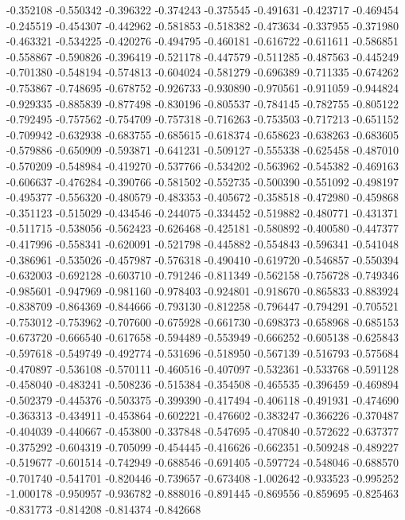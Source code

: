 -0.352108
-0.550342
-0.396322
-0.374243
-0.375545
-0.491631
-0.423717
-0.469454
-0.245519
-0.454307
-0.442962
-0.581853
-0.518382
-0.473634
-0.337955
-0.371980
-0.463321
-0.534225
-0.420276
-0.494795
-0.460181
-0.616722
-0.611611
-0.586851
-0.558867
-0.590826
-0.396419
-0.521178
-0.447579
-0.511285
-0.487563
-0.445249
-0.701380
-0.548194
-0.574813
-0.604024
-0.581279
-0.696389
-0.711335
-0.674262
-0.753867
-0.748695
-0.678752
-0.926733
-0.930890
-0.970561
-0.911059
-0.944824
-0.929335
-0.885839
-0.877498
-0.830196
-0.805537
-0.784145
-0.782755
-0.805122
-0.792495
-0.757562
-0.754709
-0.757318
-0.716263
-0.753503
-0.717213
-0.651152
-0.709942
-0.632938
-0.683755
-0.685615
-0.618374
-0.658623
-0.638263
-0.683605
-0.579886
-0.650909
-0.593871
-0.641231
-0.509127
-0.555338
-0.625458
-0.487010
-0.570209
-0.548984
-0.419270
-0.537766
-0.534202
-0.563962
-0.545382
-0.469163
-0.606637
-0.476284
-0.390766
-0.581502
-0.552735
-0.500390
-0.551092
-0.498197
-0.495377
-0.556320
-0.480579
-0.483353
-0.405672
-0.358518
-0.472980
-0.459868
-0.351123
-0.515029
-0.434546
-0.244075
-0.334452
-0.519882
-0.480771
-0.431371
-0.511715
-0.538056
-0.562423
-0.626468
-0.425181
-0.580892
-0.400580
-0.447377
-0.417996
-0.558341
-0.620091
-0.521798
-0.445882
-0.554843
-0.596341
-0.541048
-0.386961
-0.535026
-0.457987
-0.576318
-0.490410
-0.619720
-0.546857
-0.550394
-0.632003
-0.692128
-0.603710
-0.791246
-0.811349
-0.562158
-0.756728
-0.749346
-0.985601
-0.947969
-0.981160
-0.978403
-0.924801
-0.918670
-0.865833
-0.883924
-0.838709
-0.864369
-0.844666
-0.793130
-0.812258
-0.796447
-0.794291
-0.705521
-0.753012
-0.753962
-0.707600
-0.675928
-0.661730
-0.698373
-0.658968
-0.685153
-0.673720
-0.666540
-0.617658
-0.594489
-0.553949
-0.666252
-0.605138
-0.625843
-0.597618
-0.549749
-0.492774
-0.531696
-0.518950
-0.567139
-0.516793
-0.575684
-0.470897
-0.536108
-0.570111
-0.460516
-0.407097
-0.532361
-0.533768
-0.591128
-0.458040
-0.483241
-0.508236
-0.515384
-0.354508
-0.465535
-0.396459
-0.469894
-0.502379
-0.445376
-0.503375
-0.399390
-0.417494
-0.406118
-0.491931
-0.474690
-0.363313
-0.434911
-0.453864
-0.602221
-0.476602
-0.383247
-0.366226
-0.370487
-0.404039
-0.440667
-0.453800
-0.337848
-0.547695
-0.470840
-0.572622
-0.637377
-0.375292
-0.604319
-0.705099
-0.454445
-0.416626
-0.662351
-0.509248
-0.489227
-0.519677
-0.601514
-0.742949
-0.688546
-0.691405
-0.597724
-0.548046
-0.688570
-0.701740
-0.541701
-0.820446
-0.739657
-0.673408
-1.002642
-0.933523
-0.995252
-1.000178
-0.950957
-0.936782
-0.888016
-0.891445
-0.869556
-0.859695
-0.825463
-0.831773
-0.814208
-0.814374
-0.842668
